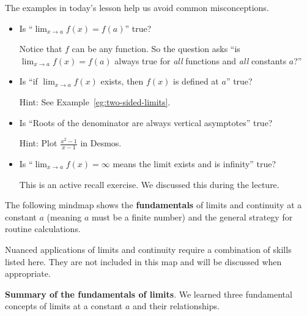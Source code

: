 \documentclass[../main.tex]{subfiles}
\begin{document}
\begin{exercise}
  The examples in today's lesson help us avoid common misconceptions.

  \begin{itemize}[wide]
    \item Is \enquote{\(\lim_{x \to a} f(x) = f(a)\)} true?

      {\footnotesize Notice that \(f\) can be any function. So the question asks \enquote{is \(\lim_{x \to a} f(x) = f(a)\) always true for \emph{all} functions and \emph{all} constants \(a\)?}}

      \blanks*

    \item Is \enquote{if \(\lim_{x \to a} f(x)\) exists, then \(f(x)\) is defined at \(a\)} true?

      {\footnotesize Hint: See Example~\ref{eg:two-sided-limits}.}

      \blanks*
    \item Is \enquote{Roots of the denominator are always vertical asymptotes} true?

      {\footnotesize Hint: Plot \(\tfrac{x^{2}-1}{x-1}\) in Desmos.}

      \blanks*

    \item Is \enquote{\(\lim_{x \to a} f(x) = \infty\) means the limit exists and is infinity} true?

      {\footnotesize This is an active recall exercise. We discussed this during the lecture.}

      \blanks*

  \end{itemize}

\end{exercise}
\clearpage

The following mindmap shows the \textbf{fundamentals} of limits and continuity at a constant \(a\) (meaning \(a\) must be a finite number) and the general strategy for routine calculations.

\faExclamationTriangle{} Nuanced applications of limits and continuity require a combination of skills listed here. They are not included in this map and will be discussed when appropriate.

\begin{center}
  
\end{center}
\label{page:mindmap-limits-full}
\clearpage


\textbf{Summary of the fundamentals of limits}.
We learned three fundamental concepts of limits at a constant \(a\) and their relationships.
\end{document}
